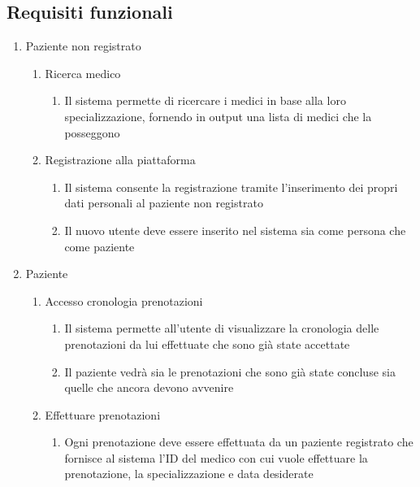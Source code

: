 \documentclass[12pt]{report}
\begin{document}
    \subsection{Requisiti funzionali}
    \begin{enumerate}
        \item Paziente non registrato
            \begin{enumerate}
                \item Ricerca medico
                    \begin{enumerate}
                        \item Il sistema permette di ricercare i medici in base alla loro specializzazione, fornendo in output una lista di medici che la posseggono 
                    \end{enumerate}
                \item Registrazione alla piattaforma
                    \begin{enumerate}
                        \item Il sistema consente la registrazione tramite l'inserimento dei propri dati personali al paziente non registrato
                        \item Il nuovo utente deve essere inserito nel sistema sia come persona che come paziente
                    \end{enumerate}
            \end{enumerate}
        \item Paziente
            \begin{enumerate}
                \item Accesso cronologia prenotazioni
                    \begin{enumerate}
                        \item Il sistema permette all'utente di visualizzare la cronologia delle prenotazioni da lui effettuate che sono già state accettate
                        \item Il paziente vedrà sia le prenotazioni che sono già state concluse sia quelle che ancora devono avvenire
                    \end{enumerate}
                \item Effettuare prenotazioni
                    \begin{enumerate}
                        \item Ogni prenotazione deve essere effettuata da un paziente registrato che fornisce al sistema l'ID del medico con cui vuole effettuare la prenotazione, la specializzazione e data desiderate

\end{enumerate}
\end{enumerate}
\end{enumerate}
\end{document}
